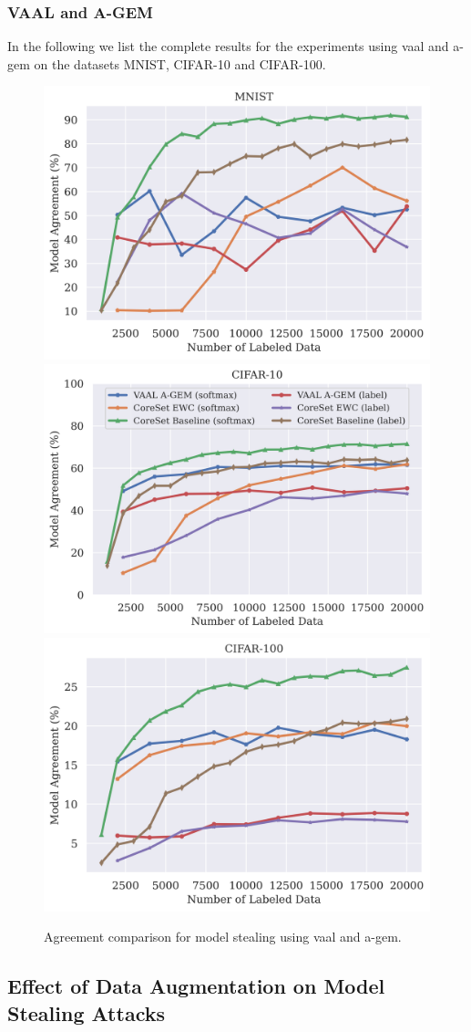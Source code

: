 \clearpage

\subsubsection{VAAL and A-GEM}
\label{sec:Appendix:CALMS:VAALAGEM}
In the following we list the complete results for the experiments using \gls{vaal} and \gls{a-gem} on the datasets MNIST, CIFAR-10 and CIFAR-100.
\begin{figure}[!htb]
    \centering
    \includegraphics[width=0.316\linewidth]{images/results_CALMS/mnist_vaal_agem.png} 
    \includegraphics[width=0.32\linewidth]{images/results_CALMS/cifar_vaal_agem.png}
    \includegraphics[width=0.316\linewidth]{images/results_CALMS/cifar100_vaal_agem.png}
    \caption{Agreement comparison for model stealing using \gls{vaal} and \gls{a-gem}.}
    \label{fig:CALMS_VAAL_AGEM}
\end{figure}

\subsection{Effect of Data Augmentation on Model Stealing Attacks}
\label{sec:Appendix:EffectDataAugmentation}

